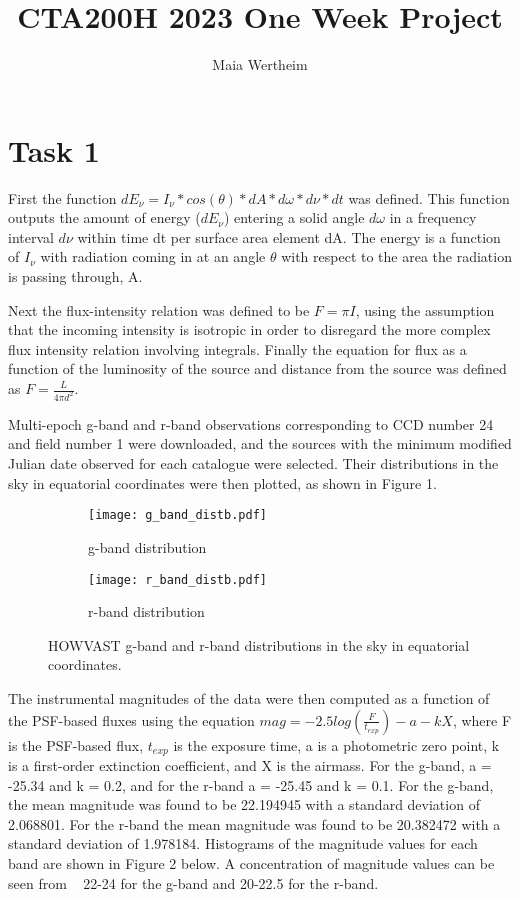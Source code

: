 \documentclass{article}
\title{CTA200H 2023 One Week Project}
\author{Maia Wertheim}
\date{}
\begin{document}
\maketitle

\section*{Task 1}

First the function $dE_\nu = I_\nu*cos(\theta)*dA*d\omega*d\nu*dt$ was defined. This function outputs the amount of energy ($dE_\nu$) entering a solid angle $d\omega$ in a frequency interval $d\nu$ within time dt per surface area element dA. The energy is a function of $I_\nu$ with radiation coming in at an angle $\theta$ with respect to the area the radiation is passing through, A. 

Next the flux-intensity relation was defined to be $F = \pi I$, using the assumption that the incoming intensity is isotropic in order to disregard the more complex flux intensity relation involving integrals. 
Finally the equation for flux as a function of the luminosity of the source and distance from the source was defined as $F= \frac{L}{4\pi d^2}$. 

Multi-epoch g-band and r-band observations corresponding to CCD number 24 and field number 1 were downloaded, and the sources with the minimum modified Julian date observed for each catalogue were selected. Their distributions in the sky in equatorial coordinates were then plotted, as shown in Figure 1. 

\begin{figure}[!ht]
\begin{subfigure}{.5\textwidth}
  \centering
  \texttt{[image: g\_band\_distb.pdf]}
  \caption{g-band distribution}
  \label{fig:sfig1}
\end{subfigure}%
\begin{subfigure}{.5\textwidth}
  \centering
  \texttt{[image: r\_band\_distb.pdf]}
  \caption{r-band distribution}
  \label{fig:sfig2}
\end{subfigure}
\caption{HOWVAST g-band and r-band distributions in the sky in equatorial coordinates.}
\label{fig:fig}
\end{figure}

The instrumental magnitudes of the data were then computed as a function of the PSF-based fluxes using the equation $mag = -2.5 log(\frac{F}{t_{exp}}) - a - k X$, where F is the PSF-based flux, $t_{exp}$ is the exposure time, a is a photometric zero point, k is a first-order extinction coefficient, and X is the airmass. For the g-band, a = -25.34 and k = 0.2, and for the r-band a = -25.45 and k = 0.1. For the g-band, the mean magnitude was found to be 22.194945 with a standard deviation of 2.068801. For the r-band the mean magnitude was found to be 20.382472 with a standard deviation of 1.978184. Histograms of the magnitude values for each band are shown in Figure 2 below. A concentration of magnitude values can be seen from ~ 22-24 for the g-band and 20-22.5 for the r-band. 
\end{document}
